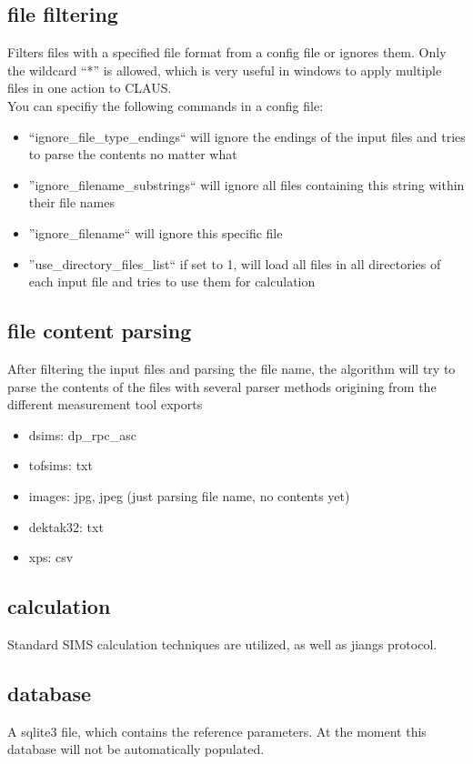 \documentclass[a4paper,10pt]{article}
\begin{document}
\subsection{file filtering}
Filters files with a specified file format from a config file or ignores them. Only the wildcard ``*'' is allowed, which is very useful in windows to apply multiple files in one action to CLAUS.\\
You can specifiy the following commands in a config file:\\
\begin{itemize}
 \item ``ignore\_file\_type\_endings`` will ignore the endings of the input files and tries to parse the contents no matter what
 \item ''ignore\_filename\_substrings`` will ignore all files containing this string within their file names
 \item ''ignore\_filename`` will ignore this specific file
 \item ''use\_directory\_files\_list`` if set to 1, will load all files in all directories of each input file and tries to use them for calculation
\end{itemize}


\subsection{file content parsing}
After filtering the input files and parsing the file name, the algorithm will try to parse the contents of the files with several parser methods origining from the different measurement tool exports
\begin{itemize}
 \item dsims: dp\_rpc\_asc
 \item tofsims: txt
 \item images: jpg, jpeg (just parsing file name, no contents yet)
 \item dektak32: txt
 \item xps: csv
\end{itemize}

\subsection{calculation}
Standard SIMS calculation techniques are utilized, as well as jiangs\cite{jiang} protocol.

\subsection{database}
A sqlite3 file, which contains the reference parameters. At the moment this database will not be automatically populated.
\end{document}
